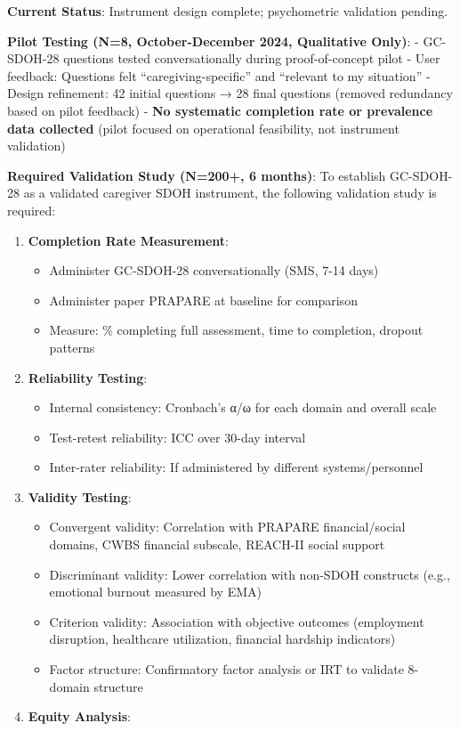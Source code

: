 \documentclass[
]{article}
\providecommand{\tightlist}{%
  \setlength{\itemsep}{0pt}\setlength{\parskip}{0pt}}
\begin{document}
\textbf{Current Status}: Instrument design complete; psychometric
validation pending.

\textbf{Pilot Testing (N=8, October-December 2024, Qualitative Only)}: -
GC-SDOH-28 questions tested conversationally during proof-of-concept
pilot - User feedback: Questions felt ``caregiving-specific'' and
``relevant to my situation'' - Design refinement: 42 initial questions →
28 final questions (removed redundancy based on pilot feedback) -
\textbf{No systematic completion rate or prevalence data collected}
(pilot focused on operational feasibility, not instrument validation)

\textbf{Required Validation Study (N=200+, 6 months)}: To establish
GC-SDOH-28 as a validated caregiver SDOH instrument, the following
validation study is required:

\begin{enumerate}
\def\labelenumi{\arabic{enumi}.}
\tightlist
\item
  \textbf{Completion Rate Measurement}:

  \begin{itemize}
  \tightlist
  \item
    Administer GC-SDOH-28 conversationally (SMS, 7-14 days)
  \item
    Administer paper PRAPARE at baseline for comparison
  \item
    Measure: \% completing full assessment, time to completion, dropout
    patterns
  \end{itemize}
\item
  \textbf{Reliability Testing}:

  \begin{itemize}
  \tightlist
  \item
    Internal consistency: Cronbach's α/ω for each domain and overall
    scale
  \item
    Test-retest reliability: ICC over 30-day interval
  \item
    Inter-rater reliability: If administered by different
    systems/personnel
  \end{itemize}
\item
  \textbf{Validity Testing}:

  \begin{itemize}
  \tightlist
  \item
    Convergent validity: Correlation with PRAPARE financial/social
    domains, CWBS financial subscale, REACH-II social support
  \item
    Discriminant validity: Lower correlation with non-SDOH constructs
    (e.g., emotional burnout measured by EMA)
  \item
    Criterion validity: Association with objective outcomes (employment
    disruption, healthcare utilization, financial hardship indicators)
  \item
    Factor structure: Confirmatory factor analysis or IRT to validate
    8-domain structure
  \end{itemize}
\item
  \textbf{Equity Analysis}:


\end{enumerate}
\end{document}
